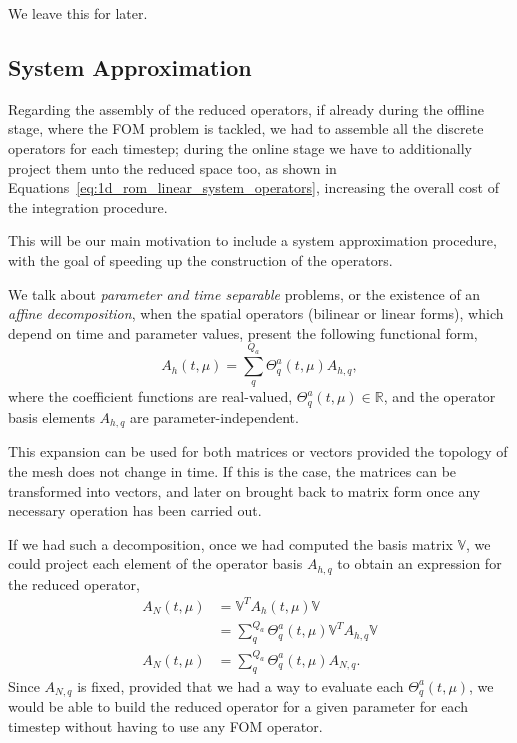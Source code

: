 \documentclass[../1_heat_equation.tex]{subfiles}
\newcommand{\rbV}{\ensuremath{\mathbb{V}}}
\newcommand{\rbVT}{\ensuremath{\rbV^T}}
\begin{document}
We leave this for later.

\subsection{System Approximation}
\label{sec:1d_rom_heat_equation_system_approximation_deim}
Regarding the assembly of the reduced operators, if already during the offline stage, where the FOM problem is tackled, we had to assemble all the discrete operators for each timestep;
during the online stage we have to additionally project them unto the reduced space too, as shown in Equations~\eqref{eq:1d_rom_linear_system_operators},
increasing the overall cost of the integration procedure.

This will be our main motivation to include a system approximation procedure,
with the goal of speeding up the construction of the operators.

We talk about \emph{parameter and time separable} problems, or the existence of an \emph{affine decomposition},
when the spatial operators (bilinear or linear forms), which depend on time and parameter values, present the following functional form,
\begin{equation}
    \label{eq:1d_rom_heat_equation_separable_form_time_param}
    A_h(t, \mu) = \sum_q^{Q_a} \Theta_q^a(t, \mu) A_{h,q},
\end{equation}
where the coefficient functions are real-valued, \mbox{$\Theta_q^a(t, \mu) \in \mathbb{R}$}, and the operator basis elements $A_{h,q}$ are parameter-independent.

This expansion can be used for both matrices or vectors provided the topology of the mesh does not change in time.
If this is the case, the matrices can be transformed into vectors, and later on brought back to matrix form once any necessary operation has been carried out.

If we had such a decomposition, once we had computed the basis matrix \rbV, we could project each element of the operator basis $A_{h, q}$ to obtain an expression for the reduced operator, 
\begin{equation}
    \begin{split}
        A_N(t, \mu) &= \rbVT A_h(t, \mu) \rbV \\ 
        &= \sum_q^{Q_a} \Theta_q^a(t, \mu) \rbVT  A_{h, q} \rbV \\
        A_N(t, \mu) &= \sum_q^{Q_a} \Theta_q^a(t, \mu) A_{N,q}.
    \end{split}
\end{equation}
Since $A_{N, q}$ is fixed, provided that we had a way to evaluate each $\Theta_q^a(t, \mu)$, we would be able to build the reduced operator for a given parameter for each timestep without having to use any FOM operator. 
\end{document}
